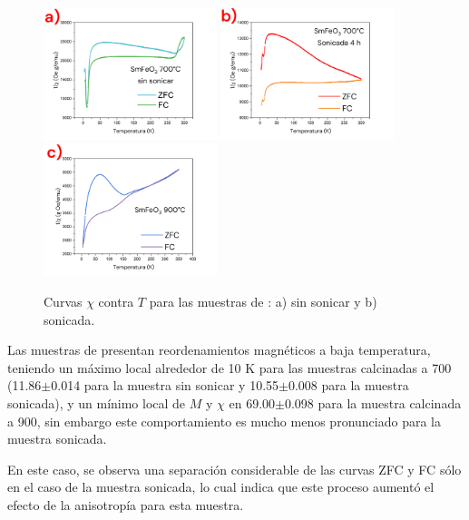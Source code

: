 \documentclass[../main.tex]{subfiles}
\begin{document}
\begin{figure}[H]
    \centering
    \includegraphics[width=0.45\textwidth]{fig/chivTSm.png}
    \quad
    \includegraphics[width=0.45\textwidth]{fig/chivTSm-S.png}
    \includegraphics[width=0.45\textwidth]{fig/chivTSm900.png}
    \caption{Curvas $\chi$ contra $T$ para las muestras de \sama{}: a) sin sonicar y b) sonicada.}
    \label{fig:chivTSm}
\end{figure}
Las muestras de \sama{} presentan reordenamientos magnéticos a baja temperatura, teniendo un máximo local alrededor de 10 K para las muestras calcinadas a 700\gradoC{} (11.86$\pm$0.014 para la muestra sin sonicar y 10.55$\pm$0.008 para la muestra sonicada), y un mínimo local de $M$ y $\chi$ en 69.00$\pm$0.098 para la muestra calcinada a 900\gradoC{}, sin embargo este comportamiento es mucho menos pronunciado para la muestra sonicada.

En este caso, se observa una separación considerable de las curvas ZFC y FC sólo en el caso de la muestra sonicada, lo cual indica que este proceso aumentó el efecto de la anisotropía para esta muestra.
\end{document}
